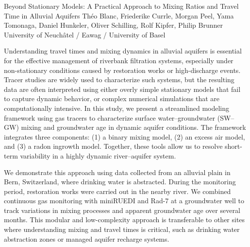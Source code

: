 \begin{conf-abstract}
{Beyond Stationary Models: A Practical Approach to Mixing Ratios and Travel Time in Alluvial Aquifers}
{Théo Blanc, Friederike Currle, Morgan Peel, Yama Tomonaga, Daniel Hunkeler, Oliver Schilling, Rolf Kipfer, Philip Brunner}
{University of Neuchâtel / Eawag / University of Basel}
{Understanding travel times and mixing dynamics in alluvial aquifers is essential for the effective management of riverbank filtration systems, especially under non-stationary conditions caused by restoration works or high-discharge events. Tracer studies are widely used to characterize such systems, but the resulting data are often interpreted using either overly simple stationary models that fail to capture dynamic behavior, or complex numerical simulations that are computationally intensive.
In this study, we present a streamlined modeling framework using gas tracers to characterize surface water–groundwater (SW–GW) mixing and groundwater age in dynamic aquifer conditions. The framework integrates three components: (1) a binary mixing model, (2) an excess air model, and (3) a radon ingrowth model. Together, these tools allow us to resolve short-term variability in a highly dynamic river–aquifer system.

We demonstrate this approach using data collected from an alluvial plain in Bern, Switzerland, where drinking water is abstracted. During the monitoring period, restoration works were carried out in the nearby river. We combined continuous gas monitoring with miniRUEDI and Rad-7 at a groundwater well to track variations in mixing processes and apparent groundwater age over several months.
This modular and low-complexity approach is transferable to other sites where understanding mixing and travel times is critical, such as drinking water abstraction zones or managed aquifer recharge systems.
}
\end{conf-abstract}
